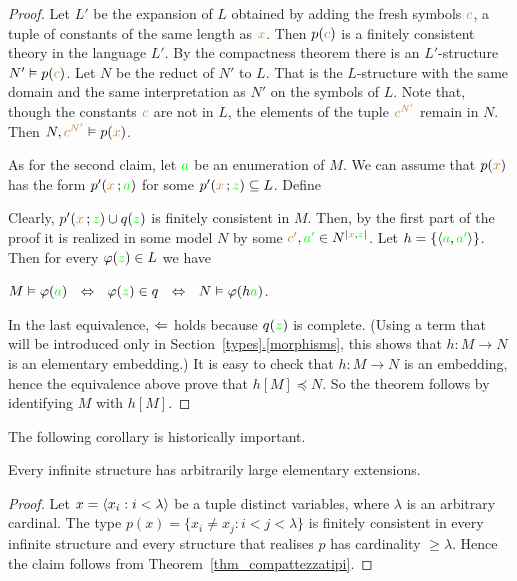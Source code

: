 \documentclass[creche.tex]{subfiles}
\begin{document}
\begin{proof}
Let $L'$ be the expansion of $L$ obtained by adding the fresh symbols ${\color{brown} c}$, a tuple of constants of the same length as ${\color{brown} x}$. Then $p({\color{brown} c})$ is a finitely consistent theory in the language $L'$. By the compactness theorem there is an $L'$-structure $N'\vDash p({\color{brown} c})$. Let $N$ be the reduct of $N'$ to $L$. That is the $L$-structure with the same domain and the same interpretation as $N'$ on the symbols of $L$. Note that, though the constants ${\color{brown} c}$ are not in $L$, the elements of the tuple ${\color{brown} c^{N'}}$ remain in $N$. Then $N,{\color{brown} c^{N'}}\vDash p({\color{brown} x})$.  

As for the second claim, let ${\color{green} a}$ be an enumeration of $M$. We can assume that $p({\color{brown} x})$ has the form $p'({\color{brown} x}\,;{\color{green} a})$ for some $p'({\color{brown} x}\,;{\color{green} z})\subseteq L$. Define


Clearly, $p'({\color{brown} x}\,;{\color{green} z})\cup q({\color{green} z})$ is finitely consistent in $M$. Then, by the first part of the proof it is realized in some model $N$ by some ${\color{brown} c'},{\color{green} a'}\in N^{|{\color{brown} x},{\color{green} z}|}$. Let $h=\{\langle{\color{green}a},{\color{green} a'}\rangle\}$. Then for every $\varphi({\color{green} z})\in L$ we have

\hfil $M\models \phi({\gr a})\ \  \IFF\ \  \phi({\gr z})\in q\ \   \IFF\ \  N\models \phi(h{\gr a})$.

In the last equivalence, $\Leftarrow$ holds because $q({\color{green} z})$ is complete. (Using a term that will be introduced only in Section~\hyperref[morphisms]{\ref*{types}.\ref*{morphisms}}, this shows that  $h:M\to N$ is an elementary embedding.) It is easy to check that $h:M\to N$ is an embedding, hence the equivalence above prove that $h[M]\preceq N$. So the theorem follows by identifying $M$ with $h[M]$.
\end{proof}

The following corollary is historically important.

\begin{void_thm}
Every infinite structure has arbitrarily large elementary extensions.
\end{void_thm}

\begin{proof}
Let $x=\langle x_i:i<\lambda\rangle$ be a tuple distinct variables, where $\lambda$ is an arbitrary cardinal. The type $p(x)=\big\{x_i\neq x_j: i<j<\lambda\big\}$ is finitely consistent in every infinite structure and every structure that realises $p$ has cardinality $\ge\lambda$. Hence the claim follows from Theorem~\ref{thm_compattezzatipi}.
\end{proof}
\end{document}
